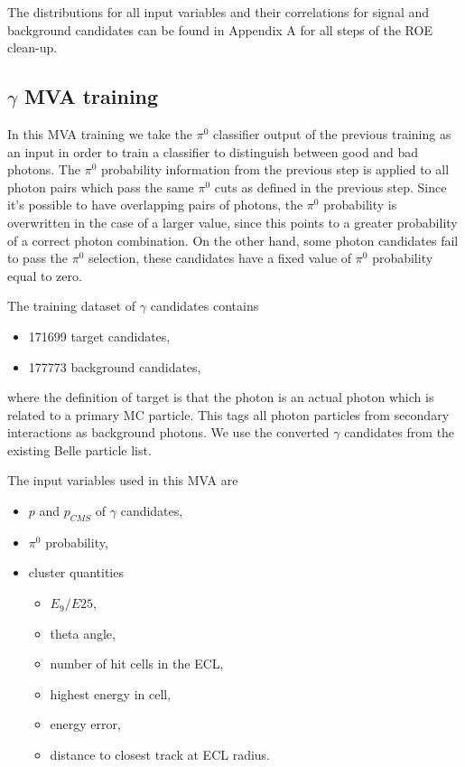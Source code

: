 The distributions for all input variables and their correlations for signal and background candidates can be found in Appendix A for all steps of the ROE clean-up.


\subsection{$\gamma$ MVA training}

In this MVA training we take the $\pi^0$ classifier output of the previous training as an input in order to train a classifier to distinguish between good and bad photons. The $\pi^0$ probability information from the previous step is applied to all photon pairs which pass the same $\pi^0$ cuts as defined in the previous step. Since it's possible to have overlapping pairs of photons, the $\pi^0$ probability is overwritten in the case of a larger value, since this points to a greater probability of a correct photon combination. On the other hand, some photon candidates fail to pass the $\pi^0$ selection, these candidates have a fixed value of $\pi^0$ probability equal to zero.

The training dataset of $\gamma$ candidates contains
\begin{itemize}
\item 171699 target candidates,
\item 177773 background candidates,
\end{itemize}
where the definition of target is that the photon is an actual photon which is related to a primary MC particle. This tags all photon particles from secondary interactions as background photons. We use the converted $\gamma$ candidates from the existing Belle particle list. 

The input variables used in this MVA are
\begin{itemize}
\item $p$ and $p_{CMS}$ of $\gamma$ candidates,
\item $\pi^0$ probability,
\item cluster quantities
	\begin{itemize}
	\item $E_9/E{25}$,
	\item theta angle,
	\item number of hit cells in the ECL,
	\item highest energy in cell,
	\item energy error,
	\item distance to closest track at ECL radius.
	\end{itemize}
\end{itemize}

